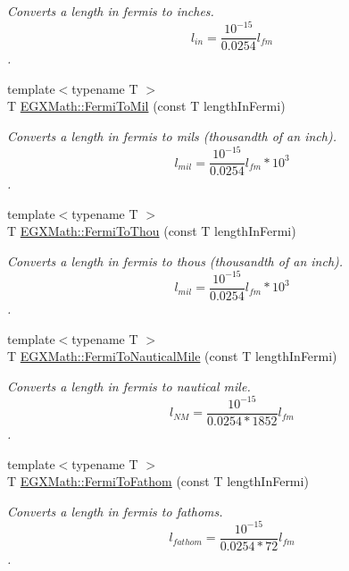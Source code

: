 \begin{DoxyCompactItemize}
\begin{DoxyCompactList}\small\item\em Converts a length in fermis to inches. \[ l_{in}= \frac{10^{-15}}{0.0254} l_{fm} \]. \end{DoxyCompactList}\item 
{\footnotesize template$<$typename T $>$ }\\T \mbox{\hyperlink{group___e_g_x_math-_conversions-_length_conversions-_non-_s_i-_fermi-_imperial_ga8559f43da08dbb3b2e09fab322904953}{E\+G\+X\+Math\+::\+Fermi\+To\+Mil}} (const T length\+In\+Fermi)
\begin{DoxyCompactList}\small\item\em Converts a length in fermis to mils (thousandth of an inch). \[ l_{mil}= \frac{10^{-15}}{0.0254} l_{fm} * 10^{3} \]. \end{DoxyCompactList}\item 
{\footnotesize template$<$typename T $>$ }\\T \mbox{\hyperlink{group___e_g_x_math-_conversions-_length_conversions-_non-_s_i-_fermi-_imperial_ga370507ab066f38bc761a2ecd2b55c670}{E\+G\+X\+Math\+::\+Fermi\+To\+Thou}} (const T length\+In\+Fermi)
\begin{DoxyCompactList}\small\item\em Converts a length in fermis to thous (thousandth of an inch). \[ l_{mil}= \frac{10^{-15}}{0.0254} l_{fm} * 10^{3} \]. \end{DoxyCompactList}\item 
{\footnotesize template$<$typename T $>$ }\\T \mbox{\hyperlink{group___e_g_x_math-_conversions-_length_conversions-_non-_s_i-_fermi-_nautical_gac5966592cf227d0a5aa87ead6a4ca7d8}{E\+G\+X\+Math\+::\+Fermi\+To\+Nautical\+Mile}} (const T length\+In\+Fermi)
\begin{DoxyCompactList}\small\item\em Converts a length in fermis to nautical mile. \[ l_{NM}= \frac{10^{-15}}{0.0254 * 1852} l_{fm} \]. \end{DoxyCompactList}\item 
{\footnotesize template$<$typename T $>$ }\\T \mbox{\hyperlink{group___e_g_x_math-_conversions-_length_conversions-_non-_s_i-_fermi-_nautical_ga4c2e2453ec319beb8e5a397ded99967a}{E\+G\+X\+Math\+::\+Fermi\+To\+Fathom}} (const T length\+In\+Fermi)
\begin{DoxyCompactList}\small\item\em Converts a length in fermis to fathoms. \[ l_{fathom}= \frac{10^{-15}}{0.0254 * 72} l_{fm} \]. \end{DoxyCompactList}\item 

\end{DoxyCompactItemize}
